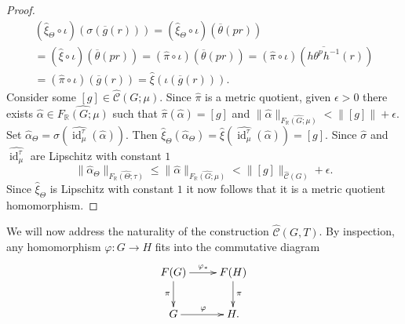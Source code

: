 \documentclass[12pt]{amsart}
\theoremstyle{definition}
\def\RR{\ensuremath{\mathbb{R}}}
\newcommand{\OP}[1]{\operatorname{#1}}
\def\Free{F}
\def\tC{\hat{\mathcal{C}}}
\begin{document}
\begin{proof}
\begin{multline*}
(\hat{\xi}_\Theta \circ \iota)(\sigma(\overline{g}(r))) =
(\hat{\xi}_\Theta \circ \iota)(\overline{\theta}(pr)) 
\\
=
(\hat{\xi} \circ \iota)(\overline{\theta}(pr)) =
(\hat{\pi} \circ \iota)(\overline{\theta}(pr)) 
=
(\hat{\pi} \circ \iota)(\overline{h\theta^p h^{-1}}(r))
\\ 
=
(\hat{\pi} \circ \iota)(\overline{g}(r)) 
=
\hat{\xi}(\iota(\overline{g}(r))).
\end{multline*}
Consider some $[g] \in \tC(G;\mu)$.
Since $\hat{\pi}$ is a metric quotient, given $\epsilon >0$ there exists $\hat{\alpha} \in \widehat{\Free_\RR(G;\mu)}$ such that $\hat{\pi}(\hat{\alpha})=[g]$ and $\|\hat{\alpha}\|_{\widehat{\Free_\RR(G;\mu)}} < \|[g]\| + \epsilon$.
Set $\hat{\alpha}_\Theta = \hat{\sigma}(\widehat{\OP{id}^\tau_\mu}(\hat{\alpha}))$.
Then $\hat{\xi}_\Theta(\hat{\alpha}_\Theta)=\hat{\xi}(\widehat{\OP{id}^\tau_\mu}(\hat{\alpha}))=[g]$.
Since $\hat{\sigma}$ and $\widehat{\OP{id}^\tau_\mu}$ are Lipschitz with constant $1$ 
\[
\| \hat{\alpha}_\Theta \|_{\widehat{\Free_\RR(\Theta;\tau)}} \leq
 \|\hat{\alpha}\|_{\widehat{\Free_\RR(G;\mu)}} < \|[g]\|_{\tC(G)} + \epsilon.
\]
Since $\widehat{\xi}_\Theta$ is Lipschitz with constant $1$ it now follows that it is a metric quotient homomorphism.
\end{proof}









We will now address the naturality of the construction $\tC(G,T)$.
By inspection, any homomorphism $\varphi \colon G \to H$ fits into the commutative diagram
\begin{equation}\label{E:pi is natural transformation}
\xymatrix{
\Free(G) \ar[r]^{\varphi_*} \ar[d]_{\pi} &
\Free(H) \ar[d]^\pi 
\\
G \ar[r]^\varphi &
H.
}
\end{equation}
\end{document}

